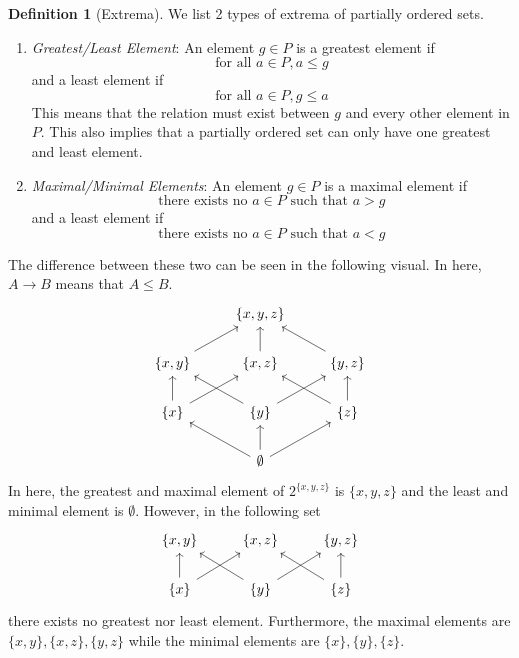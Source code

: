 \documentclass{article}
\theoremstyle{remark}
\theoremstyle{definition}
\newtheorem{definition}{Definition}[section]
\begin{document}
\begin{definition}[Extrema]
We list 2 types of extrema of partially ordered sets. 
\begin{enumerate}
    \item \textit{Greatest/Least Element}: An element $g \in P$ is a greatest element if 
    \[\text{for all } a \in P, a \leq g\]
    and a least element if
    \[\text{for all } a \in P, g \leq a\]
    This means that the relation must exist between $g$ and every other element in $P$. This also implies that a partially ordered set can only have one greatest and least element. 
    \item \textit{Maximal/Minimal Elements}: An element $g \in P$ is a maximal element if 
    \[\text{there exists no } a \in P \text{ such that } a > g\]
    and a least element if 
    \[\text{there exists no } a \in P \text{ such that } a < g\]
\end{enumerate}
The difference between these two can be seen in the following visual. In here, $A \rightarrow B$ means that $A \leq B$. 
\[
  \begin{tikzcd}
    & \{x, y, z\} & \\
    \{x, y\} \arrow{ru}{}& \{x, z\} \arrow{u}{}& \{y, z\} \arrow{lu}{}\\
    \{x\} \arrow{ru}{} \arrow{u}{}& \{y\} \arrow{lu}{} \arrow{ru}{}& \{z\} \arrow{lu}{} \arrow{u}{}\\
    & \emptyset \arrow{lu}{} \arrow{u}{} \arrow{ru}{}& 
  \end{tikzcd}
\]
In here, the greatest and maximal element of $2^{\{x, y, z\}}$ is $\{x, y, z\}$ and the least and minimal element is $\emptyset$. However, in the following set 
\[
  \begin{tikzcd}
    \{x, y\} & \{x, z\} & \{y, z\} \\
    \{x\} \arrow{ru}{} \arrow{u}{}& \{y\} \arrow{lu}{} \arrow{ru}{}& \{z\} \arrow{lu}{} \arrow{u}{}
  \end{tikzcd}\]
there exists no greatest nor least element. Furthermore, the maximal elements are $\{x, y\}, \{x, z\}, \{y, z\}$ while the minimal elements are $\{x\}, \{y\}, \{z\}$. 
\end{definition}
\end{document}
